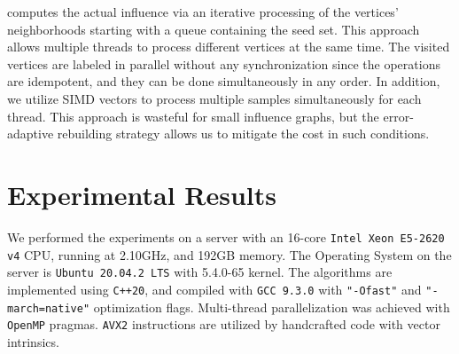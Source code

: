 \documentclass[review]{elsarticle}
\newcommand\acro{{\sc{HyperFuseR\xspace}\xspace}\xspace}
\begin{document}
\acro computes the actual influence via an iterative processing of the vertices' neighborhoods starting with a queue containing the seed set. This approach allows multiple threads to process different vertices at the same time. The visited vertices are labeled in parallel without any synchronization since the operations are idempotent, and they can be done simultaneously in any order. In addition, we utilize SIMD vectors to process multiple samples simultaneously for each thread. This approach is wasteful for small influence graphs, but the error-adaptive rebuilding strategy allows us to mitigate the cost in such conditions.   

\section{Experimental Results}\label{sec:evaluation}
We performed the experiments on a server with an 16-core {\tt Intel Xeon E5-2620 v4} CPU, running at 2.10GHz, and 192GB memory. The Operating System on the server is {\tt Ubuntu 20.04.2 LTS} with  5.4.0-65 kernel. The algorithms are implemented using {\tt C++20}, and compiled with {\tt GCC 9.3.0} with {\tt "-Ofast"} and {\tt "-march=native"} optimization flags. Multi-thread parallelization was achieved with {\tt OpenMP} pragmas. {\tt AVX2} instructions are utilized by handcrafted code with vector intrinsics.
\end{document}
